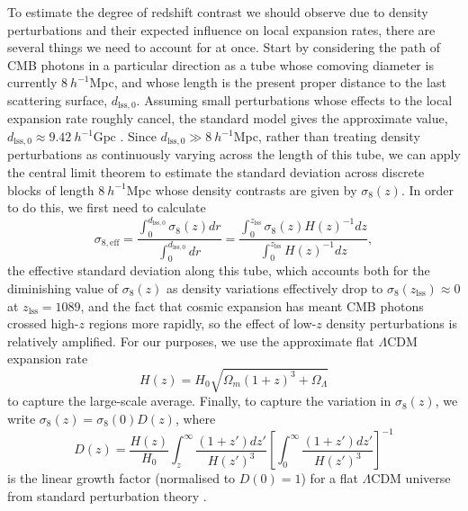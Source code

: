 \documentclass[aps,prd,reprint,superscriptaddress]{revtex4-2}
\begin{document}
To estimate the degree of redshift contrast we should observe due to density perturbations and their expected influence on local expansion rates, there are several things we need to account for at once. Start by considering the path of CMB photons in a particular direction as a tube whose comoving diameter is currently $8~h^{-1}$Mpc, and whose length is the present proper distance to the last scattering surface, $d_{\mathrm{lss},0}$. Assuming small perturbations whose effects to the local expansion rate roughly cancel, the standard model gives the approximate value, $d_{\mathrm{lss},0}\approx9.42~h^{-1}\mathrm{Gpc}$ \cite{Ryden2017}. Since $d_{\mathrm{lss},0}\gg8~h^{-1}$Mpc, rather than treating density perturbations as continuously varying across the length of this tube, we can apply the central limit theorem to estimate the standard deviation across discrete blocks of length $8~h^{-1}$Mpc whose density contrasts are given by $\sigma_8(z)$. In order to do this, we first need to calculate
\begin{equation}
    \sigma_{8,\mathrm{eff}}=\frac{\int_0^{d_{\mathrm{lss},0}}\sigma_{8}(z)dr}{\int_0^{d_{\mathrm{lss},0}}dr}=\frac{\int_0^{z_{\mathrm{lss}}}\sigma_{8}(z)H(z)^{-1}dz}{\int_0^{z_{\mathrm{lss}}}H(z)^{-1}dz},\label{eq:sigma_eff}
\end{equation}
the effective standard deviation along this tube, which accounts both for the diminishing value of $\sigma_8(z)$ as density variations effectively drop to $\sigma_8(z_{\mathrm{lss}})\approx0$ at $z_{\mathrm{lss}}=1089$, and the fact that cosmic expansion has meant CMB photons crossed high-$z$ regions more rapidly, so the effect of low-$z$ density perturbations is relatively amplified. For our purposes, we use the approximate flat $\Lambda$CDM expansion rate 
\begin{equation}
    H(z)=H_0\sqrt{\Omega_m(1+z)^3+\Omega_{\Lambda}} \label{eq:H}
\end{equation}
to capture the large-scale average. Finally, to capture the variation in $\sigma_8(z)$, we write $\sigma_8(z)=\sigma_8(0)D(z)$, where
\begin{equation}
    D(z)=\frac{H(z)}{H_0}\int_z^{\infty}\frac{(1+z')dz'}{H(z')^3}\left[\int_0^{\infty}\frac{(1+z')dz'}{H(z')^3}\right]^{-1}\label{eq:Dz}
\end{equation}
is the linear growth factor (normalised to $D(0)=1$) for a flat $\Lambda$CDM universe from standard perturbation theory \cite{Peebles1980}. 
\end{document}
